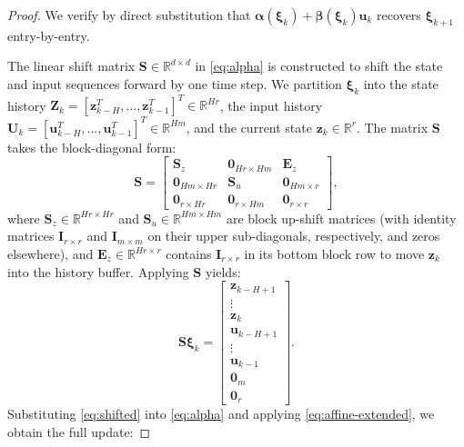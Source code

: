 \documentclass[10pt,a4paper]{amsart}
\begin{document}
\begin{proof}
We verify by direct substitution that $\boldsymbol{\alpha}(\boldsymbol{\xi}_k)+\boldsymbol{\beta}(\boldsymbol{\xi}_k)\mathbf{u}_k$ recovers $\boldsymbol{\xi}_{k+1}$ entry-by-entry.

The linear shift matrix $\mathbf{S} \in \mathbb{R}^{d \times d}$ in \eqref{eq:alpha} is constructed to shift the state and input sequences forward by one time step.
We partition $\boldsymbol{\xi}_k$ into the state history $\mathbf{Z}_{k} = [\mathbf{z}^T_{k-H}, \dots, \mathbf{z}^T_{k-1}]^T \in \mathbb{R}^{Hr}$, the input history $\mathbf{U}_{k} = [\mathbf{u}^T_{k-H}, \dots, \mathbf{u}^T_{k-1}]^T \in \mathbb{R}^{Hm}$, and the current state $\mathbf{z}_k \in \mathbb{R}^r$. The matrix $\mathbf{S}$ takes the block-diagonal form:
\begin{equation*}
\mathbf{S} = \begin{bmatrix}
\mathbf{S}_z & \mathbf{0}_{Hr \times Hm} & \mathbf{E}_z \\
\mathbf{0}_{Hm \times Hr} & \mathbf{S}_u & \mathbf{0}_{Hm \times r} \\
\mathbf{0}_{r \times Hr} & \mathbf{0}_{r \times Hm} & \mathbf{0}_{r \times r}
\end{bmatrix},
\end{equation*}
where $\mathbf{S}_z \in \mathbb{R}^{Hr \times Hr}$ and $\mathbf{S}_u \in \mathbb{R}^{Hm \times Hm}$ are block up-shift matrices (with identity matrices $\mathbf{I}_{r\times r}$ and $\mathbf{I}_{m \times m}$ on their upper sub-diagonals, respectively, and zeros elsewhere), and $\mathbf{E}_z \in \mathbb{R}^{Hr \times r}$ contains $\mathbf{I}_{r \times r}$ in its bottom block row to move $\mathbf{z}_k$ into the history buffer. Applying $\mathbf{S}$ yields:
\begin{equation}
\label{eq:shifted}
\mathbf{S} \boldsymbol{\xi}_k = \begin{bmatrix} \mathbf{z}_{k-H+1} \\ \vdots \\ \mathbf{z}_{k} \\ \mathbf{u}_{k-H+1} \\ \vdots \\ \mathbf{u}_{k-1} \\ \mathbf{0}_{m} \\ \mathbf{0}_{r} \end{bmatrix}.
\end{equation}
Substituting \eqref{eq:shifted} into \eqref{eq:alpha} and applying \eqref{eq:affine-extended}, we obtain the full update:

\end{proof}
\end{document}
